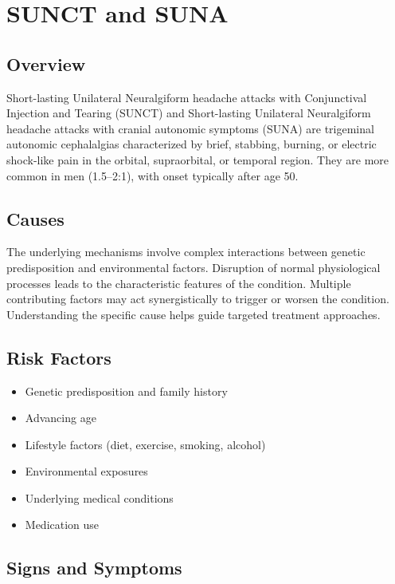 \chapter{SUNCT and SUNA}
\label{sec:SUNCT SUNA}

\section{Overview}
Short-lasting Unilateral Neuralgiform headache attacks with Conjunctival Injection and Tearing (SUNCT) and Short-lasting Unilateral Neuralgiform headache attacks with cranial autonomic symptoms (SUNA) are trigeminal autonomic cephalalgias characterized by brief, stabbing, burning, or electric shock-like pain in the orbital, supraorbital, or temporal region. They are more common in men (1.5--2:1), with onset typically after age 50.
\section{Causes}
The underlying mechanisms involve complex interactions between genetic predisposition and environmental factors. Disruption of normal physiological processes leads to the characteristic features of the condition. Multiple contributing factors may act synergistically to trigger or worsen the condition. Understanding the specific cause helps guide targeted treatment approaches.
\section{Risk Factors}


\begin{itemize}[noitemsep]
  \item Genetic predisposition and family history
  \item Advancing age
  \item Lifestyle factors (diet, exercise, smoking, alcohol)
  \item Environmental exposures
  \item Underlying medical conditions
  \item Medication use
\end{itemize}
\section{Signs and Symptoms}

